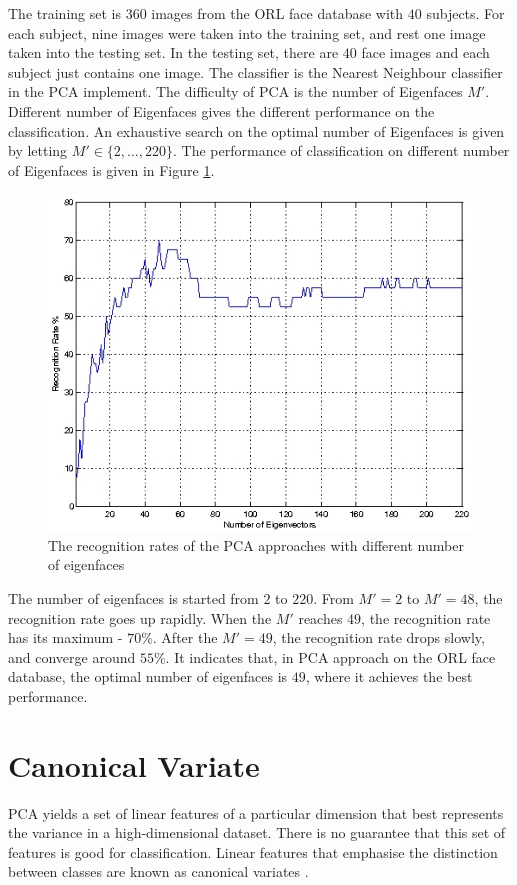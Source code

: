 The training set is $360$ images from the \mbox{ORL} face database with $40$ subjects. For each subject, nine images were taken into the training set, and rest one image taken into the testing set. In the testing set, there are $40$ face images and each subject just contains one image. The classifier is the Nearest Neighbour classifier in the PCA implement. The difficulty of PCA is the number of Eigenfaces $M'$. Different number of Eigenfaces gives the different performance on the classification. An exhaustive search on the optimal number of Eigenfaces is given by letting $M'\in\{2,\ldots,220\}$. The performance of classification on different number of Eigenfaces is given in \mbox{Figure} \ref{fig:differenteigens}.
\begin{figure}[ht]
\begin{center}
  \includegraphics[width=0.7\columnwidth]{ch3/figures/differenteigens.jpg}
\caption{The recognition rates of the PCA approaches with different number of eigenfaces}
\label{fig:differenteigens}
\end{center}
\end{figure} 
The number of eigenfaces is started from $2$ to $220$. From $M'=2$ to $M'=48$, the recognition rate goes up rapidly. When the $M'$ reaches $49$, the recognition rate has its maximum - $70\%$. After the $M'=49$, the recognition rate drops slowly, and converge around $55\%$. It indicates that, in PCA approach on the \mbox{ORL} face database, the optimal number of eigenfaces is $49$, where it achieves the best performance.

\section{Canonical Variate}
PCA yields a set of linear features of a particular dimension that best represents the variance in a high-dimensional dataset. There is no guarantee that this set of features is good for classification. Linear features that emphasise the distinction between classes are known as canonical variates \cite{Forsyth2003}.

